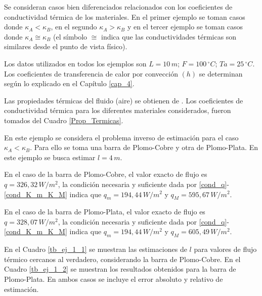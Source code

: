 Se consideran casos bien diferenciados relacionados con los coeficientes de conductividad t\'ermica de los materiales.
En el primer ejemplo se toman casos donde $\kappa_A < \kappa_B$, en el segundo $\kappa_A > \kappa_B$ y en 
el tercer ejemplo se toman casos donde $\kappa_A \cong \kappa_B$ (el s\'imbolo $\cong$ indica que las conductividades t\'ermicas son similares desde el punto de vista f\'isico). 

Los datos utilizados en todos los ejemplos son $L= 10 \, m$; $F=100 \, ^{\circ}C$; $Ta=25 \, ^{\circ}C$. 
Los coeficientes 
de transferencia de calor por convecci\'on  $(h)$ se determinan seg\'un lo explicado en el Cap\'itulo \ref{cap_4}.
 
Las propiedades t\'ermicas del fluido (aire) se obtienen de \cite{Cengel07}.
Los coeficientes de conductividad t\'ermica para los diferentes materiales considerados, fueron tomados del Cuadro \ref{Prop_Termicas}. 
%
\begin{exmpl}
\label{ej1_Cap_7}
En este ejemplo se considera el problema inverso de estimaci\'on para el caso $\kappa_A < \kappa_B$. Para ello se toma 
una barra de Plomo-Cobre y otra de Plomo-Plata. En este ejemplo se busca estimar $l=4 \, m $.
\end{exmpl}
%
En el caso de la barra de Plomo-Cobre, el valor exacto de flujo es $q=326,32 \, W/m{^{2}}$, la condici\'on necesaria y suficiente dada por \eqref{cond_q}-\eqref{cond_K_m_K_M} indica que
$q_m=194,44 \, W/m{^{2}}$ y $q_M=595,67 \, W/m{^{2}}$.

En el caso de la barra de Plomo-Plata, el valor exacto de flujo es $q=328,07 \, W/m{^{2}}$, la condici\'on necesaria y suficiente dada por \eqref{cond_q}-\eqref{cond_K_m_K_M} indica que
$q_m=194,44 \, W/m{^{2}}$ y $q_M=605,49 \, W/m{^{2}}$.

En el Cuadro \ref{tb_ej_1_1} se muestran las estimaciones de $l$ para valores de flujo t\'ermico cercanos al verdadero, considerando la barra de Plomo-Cobre. 
En el Cuadro \ref{tb_ej_1_2} se muestran los resultados obtenidos para la barra de Plomo-Plata. En ambos casos se incluye el error absoluto y relativo de estimaci\'on. 

